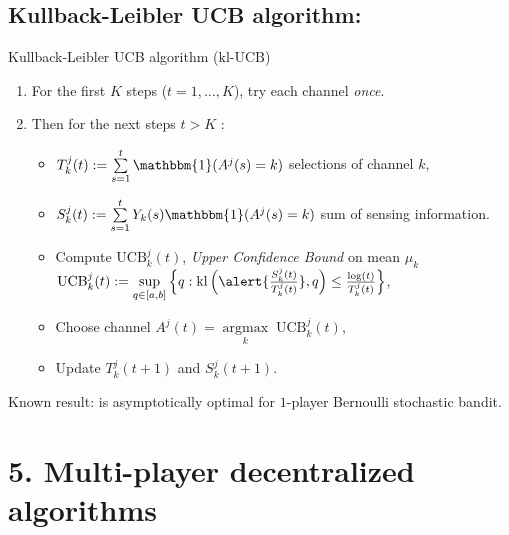 \documentclass[12pt,english,ignorenonframetext,]{beamer}
\providecommand{\tightlist}{%
  \setlength{\itemsep}{0pt}\setlength{\parskip}{0pt}}
\begin{document}
\subsection{\hfill{}Kullback-Leibler UCB algorithm: \klUCB\hfill{}}

\begin{frame}{Kullback-Leibler UCB algorithm
(\(\mathrm{kl}\)-\(\mathrm{UCB}\))}

\begin{enumerate}
\def\labelenumi{\arabic{enumi}.}
\tightlist
\item
  For the first \(K\) steps (\(t=1,\dots,K\)), try each channel
  \emph{once}.
\item
  Then for the next steps \(t > K\) :

  \begin{itemize}
  \tightlist
  \item
  \(T_k^j(t) := \sum\limits_{s=1}^{t} \mathbbm{1}(A^j(s) = k)\) selections of channel \(k\),
  \item
  \(S_k^j(t) := \sum\limits_{s=1}^{t} Y_{k}(s) \mathbbm{1}(A^j(s) = k)\) sum of sensing information.
  \item
    Compute \(\mathrm{UCB}_k^j(t)\), \emph{Upper Confidence Bound} on mean \(\mu_k\)
    \newline
    \(\mathrm{UCB}_k^j(t) := \sup\limits_{q \in [a, b]} \left\{ q : \mathrm{kl}\left(\alert{\frac{S_k^j(t)}{T_k^j(t)}}, q\right) \leq \frac{\log(t)}{T_k^j(t)} \right\}\),
  \item
    Choose channel \(A^j(t) = \mathop{\arg\max}\limits_{k} \; \mathrm{UCB}_k^j(t)\),
  \item
    Update \(T_k^j(t+1)\) and \(S_k^j(t+1)\).
  \end{itemize}
\end{enumerate}

\begin{small}
  Known result:
  \klUCB{}
  is asymptotically optimal for $1$-player Bernoulli stochastic bandit.
\end{small}

\end{frame}



\section{\hfill{}5. Multi-player decentralized algorithms\hfill{}}
\end{document}

